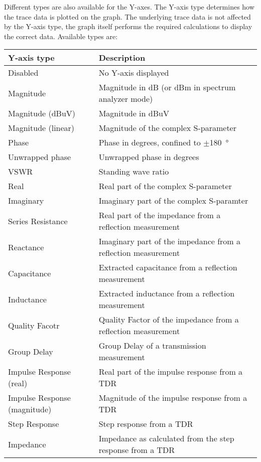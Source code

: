 \documentclass[a4paper,11pt]{article}
\begin{document}
Different types are also available for the Y-axes. The Y-axis type determines how the trace data is plotted on the graph. The underlying trace data is not affected by the Y-axis type, the graph itself performs the required calculations to display the correct data. Available types are:
\begin{center}
\begin{threeparttable}
\begin{tabularx}{\textwidth}{L{5cm}|X}
    \toprule
    \textbf{Y-axis type} & \textbf{Description} \\
    \hline
    Disabled & No Y-axis displayed \\
    \hline
    Magnitude & Magnitude in dB (or dBm in spectrum analyzer mode) \\
    \hline
    Magnitude (dBuV) & Magnitude in dBuV \\
    \hline
    Magnitude (linear) & Magnitude of the complex S-parameter\\
    \hline
    Phase & Phase in degrees, confined to $\pm$\SI{180}{\degree}\\
    \hline
    Unwrapped phase & Unwrapped phase in degrees\\
    \hline
    VSWR & Standing wave ratio\\
    \hline
    Real & Real part of the complex S-parameter\\
    \hline
    Imaginary & Imaginary part of the complex S-paramter\\
    \hline
    Series Resistance & Real part of the impedance from a reflection measurement\\
    \hline
    Reactance & Imaginary part of the impedance from a reflection measurement\\
    \hline
     Capacitance & Extracted capacitance from a reflection measurement\\ 
 \hline
        	 Inductance & Extracted inductance from a reflection measurement\\ 
\hline
        Quality Facotr	& Quality Factor of the impedance from a reflection measurement\\ 
\hline
        Group Delay & Group Delay of a transmission measurement\\ 
\hline
        Impulse Response (real)	& Real part of the impulse response from a TDR\\ 
\hline
        Impulse Response (magnitude) & Magnitude of the impulse response from a TDR\\ 
\hline
        Step Response &  Step response from a TDR\\ 
\hline
        Impedance	& Impedance as calculated from the step response from a TDR\\ 
      \bottomrule
\end{tabularx}
\end{threeparttable}
\end{center}
\end{document}
